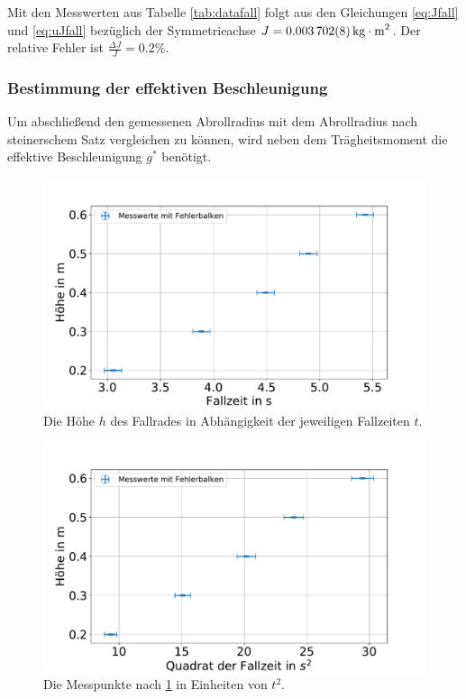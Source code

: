 Mit den Messwerten aus Tabelle \ref{tab:datafall} folgt aus den Gleichungen \ref{eq:Jfall} und \ref{eq:uJfall} bezüglich der Symmetrieachse $J=\SI{0.003702 \pm 0.000008}{kg\cdot m^2}$. Der relative Fehler ist $\frac{\Delta J}{J}=0.2\%$. 








\subsubsection{Bestimmung der effektiven Beschleunigung }
Um abschließend den gemessenen Abrollradius mit dem Abrollradius nach steinerschem Satz vergleichen zu können, wird neben dem Trägheitsmoment die effektive Beschleunigung $g^*$ benötigt.





\begin{figure}[h]
	\centering
	\includegraphics[width=0.7\linewidth]{auswertung/Fallrad/h,t}
	\caption{Die Höhe $h$ des Fallrades in Abhängigkeit der jeweiligen Fallzeiten $t$.}
	\label{fig:ht}
\end{figure}



\begin{figure}%
	\centering
	\includegraphics[width=0.7\linewidth]{auswertung/Fallrad/h,t^2}
	\caption{Die Messpunkte nach \cref{fig:ht} in Einheiten von $t^2$. }
	\label{fig:ht2}
\end{figure}





